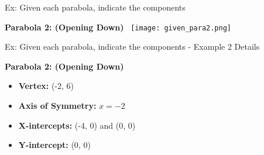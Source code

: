 \documentclass[aspectratio=169]{beamer}
\begin{document}
\begin{frame}{Ex: Given each parabola, indicate the components}
    \begin{tcolorbox}[colback=lightgray,colframe=primary,title=Example 2 - Graph]
        \footnotesize
        \textbf{Parabola 2: (Opening Down)}\
        \centering
        \texttt{[image: given\_para2.png]}
    \end{tcolorbox}
\end{frame}

\begin{frame}{Ex: Given each parabola, indicate the components - Example 2 Details}
    \begin{tcolorbox}[colback=lightgray,colframe=primary,title=Example 2 - Components]
        \footnotesize
        \textbf{Parabola 2: (Opening Down)}
        
        \begin{itemize}
            \item \textbf{Vertex:} (-2, 6)
            \item \textbf{Axis of Symmetry:} $x = -2$
            \item \textbf{X-intercepts:} (-4, 0) and (0, 0)
            \item \textbf{Y-intercept:} (0, 0)
        \end{itemize}
    \end{tcolorbox}
\end{frame}
\end{document}
